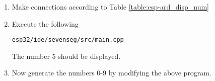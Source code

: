 \begin{enumerate}[label=\arabic*.,ref=\theenumi]
\item
Make connections according to Table \ref{table:esp-ard_disp_num}
\begin{table}[H]
\centering

\caption{}
\label{table:esp-ard_disp_num}
\end{table}

\item
Execute the following
%
\begin{lstlisting}
esp32/ide/sevenseg/src/main.cpp
\end{lstlisting}
%
The number 5 should be displayed.
\item
Now generate the numbers 0-9 by modifying the above program.

\end{enumerate}
